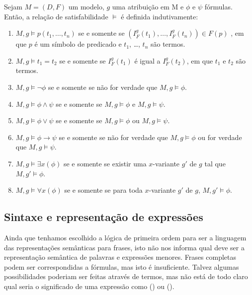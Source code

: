 \begin{defn}[Satisfação]
Sejam $M = (D,F)$ um modelo, $g$ uma atribuição em M e $\phi$ e $\psi$ fórmulas. Então, a relação de satisfabilidade $\models$ é definida indutivamente:
\begin{enumerate}
\item $M,g \models p(t_1,\dots,t_n)$ se e somente se $(I_F^g(t_1), \dots, I_F^g(t_n)) \in F(p)$ , em que $p$ é um símbolo de predicado e $t_1$, \dots, $t_n$ são termos.
\item $M, g \models t_1 = t_2$ se e somente se $I_F^g(t_1)$ é igual a $I_ F^g(t_2)$, em que $t_1$ e $t_2$ são termos.
\item $M,g \models \neg \phi$ se e somente se não for verdade que $M, g \models \phi$.
\item $M,g \models \phi \land \psi$ se e somente se $M, g \models \phi$ e $M, g \models \psi$.
\item $M,g \models \phi \lor \psi$ se e somente se $M, g \models \phi$ ou $M, g \models \psi$.
\item $M,g \models \phi \rightarrow \psi$ se e somente se  não for verdade que $M,g \models \phi$ ou for verdade que $M,g \models \psi$.
\item $M,g \models \exists x (\phi)$ se e somente se existir uma $x$-variante $g'$ de $g$ tal que $M,g' \models \phi$.
\item $M,g \models \forall x (\phi)$ se e somente se para toda $x$-variante $g'$ de $g$, $M,g' \models \phi$.
\end{enumerate}
\end{defn}


\subsection{Sintaxe e representação de expressões}

Ainda que tenhamos escolhido a lógica de primeira ordem para ser a linguagem das representações semânticas para frases, isto não nos informa qual deve ser a representação semântica de palavras e expressões menores. Frases completas podem ser correspondidas a fórmulas, mas isto é insuficiente. Talvez algumas possibilidades poderiam ser feitas através de termos, mas não está de todo claro qual seria o significado de uma expressão como  () ou  ().
\update

